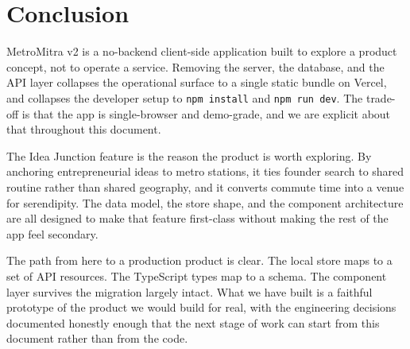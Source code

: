 \documentclass[a4paper,11pt]{article}
\begin{document}

\section{Conclusion}

MetroMitra v2 is a no-backend client-side application built to explore a
product concept, not to operate a service. Removing the server, the database,
and the API layer collapses the operational surface to a single static
bundle on Vercel, and collapses the developer setup to \texttt{npm install}
and \texttt{npm run dev}. The trade-off is that the app is single-browser
and demo-grade, and we are explicit about that throughout this document.

The Idea Junction feature is the reason the product is worth exploring. By
anchoring entrepreneurial ideas to metro stations, it ties founder search to
shared routine rather than shared geography, and it converts commute time
into a venue for serendipity. The data model, the store shape, and the
component architecture are all designed to make that feature first-class
without making the rest of the app feel secondary.

The path from here to a production product is clear. The local store maps to
a set of API resources. The TypeScript types map to a schema. The component
layer survives the migration largely intact. What we have built is a
faithful prototype of the product we would build for real, with the
engineering decisions documented honestly enough that the next stage of work
can start from this document rather than from the code.
\end{document}
